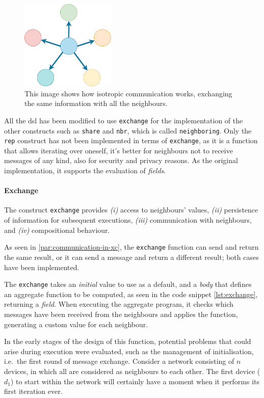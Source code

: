 \begin{figure}[h!]
    \centering
    \includegraphics[width=0.4\textwidth]{figures/isotropic}
    \caption{This image shows how isotropic communication works, exchanging the same information with all the neighbours.}
    \label{fig:isotropic}
\end{figure}

All the \ac{dsl} has been modified to use \texttt{exchange} for the implementation of the other constructs such as \texttt{share}
and \texttt{nbr}, which is called \texttt{neighboring}.
Only the \texttt{rep} construct has not been implemented in terms of \texttt{exchange}, as it is a function that allows iterating
over oneself, it's better for neighbours not to receive messages of any kind, also for security and privacy reasons.
As the original implementation, it supports the evaluation of \emph{fields}.

\paragraph{Exchange}
The construct \texttt{exchange} provides
    \emph{(i)} access to neighbours' values,
    \emph{(ii)} persistence of information for subsequent executions,
    \emph{(iii)} communication with neighbours, and
    \emph{(iv)} compositional behaviour.

As seen in \ref{par:communication-in-xc}, the \texttt{exchange} function can send and return the same result, or it
can send a message and return a different result; both cases have been implemented.

The \texttt{exchange} takes an \emph{initial} value to use as a default, and a \emph{body} that defines an aggregate
function to be computed, as seen in the code snippet \ref{lst:exchange}, returning a \emph{field}.
When executing the aggregate program, it checks which messages have been received from the neighbours and applies the function,
generating a custom value for each neighbour.

In the early stages of the design of this function, potential problems that could arise during execution were evaluated,
such as the management of initialisation, i.e.\ the first round of message exchange.
Consider a network consisting of $n$ devices, in which all are considered as neighbours to each other.
The first device ($d_1$) to start within the network will certainly have a moment when it performs its first iteration ever.

